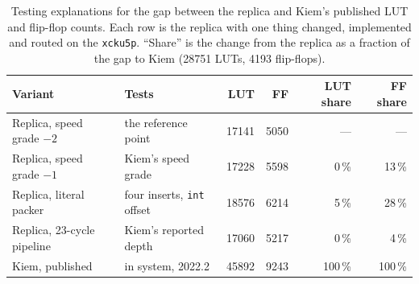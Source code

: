 \begin{table}[htbp]
\centering
\caption[Testing explanations for the gap to Kiem's LUT and FF counts]{Testing explanations for the gap between the replica and Kiem's published LUT and flip-flop counts. Each row is the replica with one thing changed, implemented and routed on the \texttt{xcku5p}. ``Share'' is the change from the replica as a fraction of the gap to Kiem (\num{28751} LUTs, \num{4193} flip-flops).}
\label{tab:kiemgap}
\small
\setlength{\tabcolsep}{4pt}
\begin{tabular}{@{}llrrrr@{}}
\toprule
Variant & Tests & LUT & FF & LUT share & FF share\\
\midrule
Replica, speed grade $-2$ & the reference point & \num{17141} & \num{5050} & --- & ---\\
Replica, speed grade $-1$ & Kiem's speed grade & \num{17228} & \num{5598} & 0\,\% & 13\,\%\\
Replica, literal packer & four inserts, \texttt{int} offset & \num{18576} & \num{6214} & 5\,\% & 28\,\%\\
Replica, 23-cycle pipeline & Kiem's reported depth & \num{17060} & \num{5217} & 0\,\% & 4\,\%\\
\midrule
Kiem, published \cite{kiem2025} & in system, 2022.2 & \num{45892} & \num{9243} & 100\,\% & 100\,\%\\
\bottomrule
\end{tabular}
\end{table}
